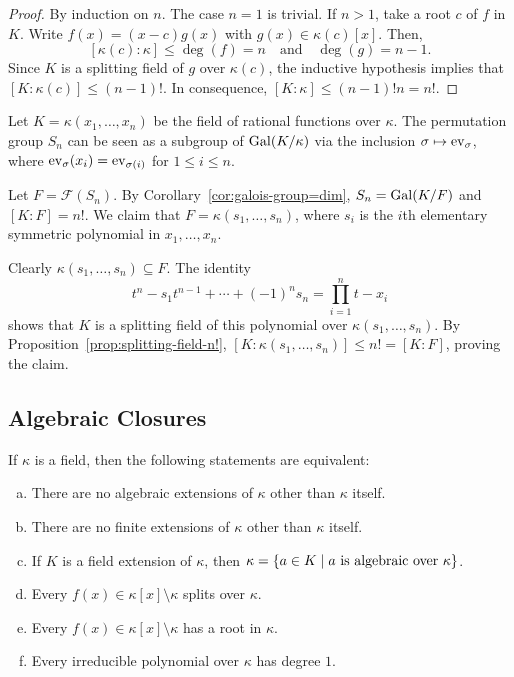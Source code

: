 \begin{proof}
    By induction on $n$. The case $n=1$ is trivial. If $n>1$, take a root $c$ of $f$ in $K$. Write $f(x)=(x-c)g(x)$ with $g(x)\in\kappa(c)[x]$. Then, 
    $$
        [\kappa(c):\kappa]\le\deg(f)=n\quad\text{and}\quad\deg(g)=n-1.
    $$
    Since $K$ is a splitting field of $g$ over $\kappa(c)$, the inductive hypothesis implies that $[K:\kappa(c)]\le (n-1)!$. In consequence, $[K:\kappa]\le(n-1)!n=n!$.
    
\end{proof}

\begin{xmpl}\label{xmpl:symmetric-polynomials}
    Let $K=\kappa(x_1,\dots,x_n)$ be the field of rational functions over $\kappa$. The permutation group $S_n$ can be seen as a subgroup of $\operatorname{Gal}(K/\kappa)$ via the inclusion $\sigma\mapsto {\rm ev}_{\sigma}$, where ${\rm ev}_{\sigma}(x_i)={\rm ev}_{\sigma(i)}$ for $1\le i\le n$.

    Let $F=\mathcal F(S_n)$. By Corollary~\ref{cor:galois-group=dim}, $S_n=\operatorname{Gal}(K/F)$ and $[K:F]=n!$. We claim that $F=\kappa(s_1,\dots,s_n)$, where $s_i$ is the $i$th elementary symmetric polynomial in $x_1,\dots,x_n$.

    Clearly $\kappa(s_1,\dots,s_n)\subseteq F$. The identity
    $$
        t^n-s_1t^{n-1}+\cdots+(-1)^ns_n=\prod_{i=1}^nt-x_i
    $$
    shows that $K$ is a splitting field of this polynomial over $\kappa(s_1,\dots,s_n)$. By Proposition~\ref{prop:splitting-field-n!}, $[K:\kappa(s_1,\dots,s_n)]\le n!=[K:F]$, proving the claim.
\end{xmpl}

\subsection{Algebraic Closures}

\begin{lem}\label{lem:closure-equivalences}
    If\/ $\kappa$ is a field, then the following statements are equivalent: 
    \begin{enumerate}[a), font=\upshape]
        \item There are no algebraic extensions of\/ $\kappa$ other than\/ $\kappa$ itself. 

        \item There are no finite extensions of\/ $\kappa$ other than\/ $\kappa$ itself. 

        \item If\/ $K$ is a field extension of\/ $\kappa$, then\/ $\kappa = \{a\in K\mid a \text{ is algebraic over }\kappa\}$. 

        \item Every\/ $f(x)\in \kappa[x]\setminus\kappa$ splits over\/ $\kappa$. 

        \item Every\/ $f(x)\in \kappa[x]\setminus\kappa$ has a root in\/ $\kappa$. 

        \item Every irreducible polynomial over\/ $\kappa$ has degree\/ $1$.
    \end{enumerate}
\end{lem}

